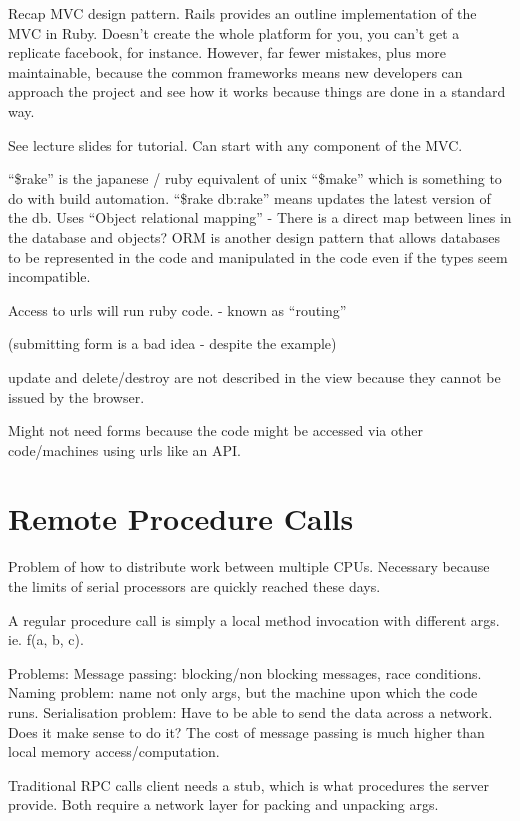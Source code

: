 \documentclass[11pt]{article}
\begin{document}
 

Recap MVC design pattern. Rails provides an outline implementation of the MVC in Ruby. Doesn’t create the whole platform for you, you can’t get a replicate facebook, for instance. However, far fewer mistakes, plus more maintainable, because the common frameworks means new developers can approach the project and see how it works because things are done in a standard way.

See lecture slides for tutorial. Can start with any component of the MVC.

``\$rake'' is the japanese / ruby equivalent of unix ``\$make'' which is something to do with build automation.
``\$rake db:rake'' means updates the latest version of the db. Uses ``Object relational mapping'' - There is a direct map between lines in the database and objects? ORM is another design pattern that allows databases to be represented in the code and manipulated in the code even if the types seem incompatible.

Access to urls will run ruby code. - known as ``routing''

(submitting form is a bad idea - despite the example)

update and delete/destroy are not described in the view because they cannot be issued by the browser.

Might not need forms because the code might be accessed via other code/machines using urls like an API.


\section{Remote Procedure Calls}
\label{sec:RPC}

Problem of how to distribute work between multiple CPUs. Necessary because the limits of serial processors are quickly reached these days.

A regular procedure call is simply a local method invocation with different args. ie. f(a, b, c).

Problems:
Message passing: blocking/non blocking messages, race conditions.
Naming problem: name not only args, but the machine upon which the code runs.
Serialisation problem: Have to be able to send the data across a network.
Does it make sense to do it? The cost of message passing is much higher than local memory access/computation.

Traditional RPC calls client needs a stub, which is what procedures the server provide. Both require a network layer for packing and unpacking args.
\end{document}
